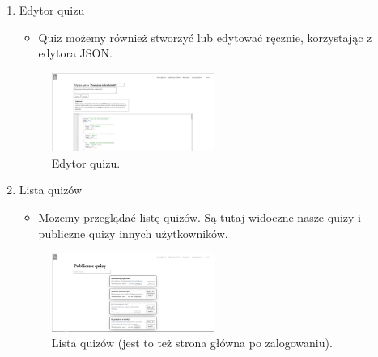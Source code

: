 \documentclass{article}
\begin{document}
\begin{enumerate}
		\item Edytor quizu \\
        \begin{minipage}{0.4\textwidth}
          \begin{itemize}
            \item Quiz możemy również stworzyć lub edytować ręcznie, korzystając z edytora JSON.
          \end{itemize}
        \end{minipage}
        \begin{minipage}{0.6\textwidth}
          \begin{figure}[H]
            \centering
            \includegraphics[width=0.5\textwidth]{../_assets/web/edit.png}
            \caption{Edytor quizu.}
            \label{fig:edit}
          \end{figure}
        \end{minipage}

		\item Lista quizów \\
        \begin{minipage}{0.4\textwidth}
          \begin{itemize}
            \item Możemy przeglądać listę quizów. Są tutaj widoczne nasze quizy i publiczne quizy innych użytkowników.
          \end{itemize}
        \end{minipage}
        \begin{minipage}{0.6\textwidth}
          \begin{figure}[H]
            \centering
            \includegraphics[width=0.5\textwidth]{../_assets/web/quizzes.png}
            \caption{Lista quizów (jest to też strona główna po zalogowaniu).}
            \label{fig:quizzes}
          \end{figure}
        \end{minipage}


\end{enumerate}
\end{document}
